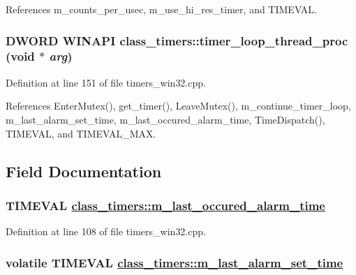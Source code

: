 References m\_\-counts\_\-per\_\-usec, m\_\-use\_\-hi\_\-res\_\-timer, and TIMEVAL.\hypertarget{classclass__timers_a68dd5b6225b3519b4bc2a0280683c87}{
\subsubsection[timer\_\-loop\_\-thread\_\-proc]{\setlength{\rightskip}{0pt plus 5cm}DWORD WINAPI class\_\-timers::timer\_\-loop\_\-thread\_\-proc (void $\ast$ {\em arg})}}
\label{classclass__timers_a68dd5b6225b3519b4bc2a0280683c87}




Definition at line 151 of file timers\_\-win32.cpp.

References Enter\-Mutex(), get\_\-timer(), Leave\-Mutex(), m\_\-continue\_\-timer\_\-loop, m\_\-last\_\-alarm\_\-set\_\-time, m\_\-last\_\-occured\_\-alarm\_\-time, Time\-Dispatch(), TIMEVAL, and TIMEVAL\_\-MAX.

\subsection{Field Documentation}
\hypertarget{classclass__timers_01c07cb9949b61fce137e60a54d001b9}{
\subsubsection[m\_\-last\_\-occured\_\-alarm\_\-time]{\setlength{\rightskip}{0pt plus 5cm}TIMEVAL \hyperlink{classclass__timers_01c07cb9949b61fce137e60a54d001b9}{class\_\-timers::m\_\-last\_\-occured\_\-alarm\_\-time}}}
\label{classclass__timers_01c07cb9949b61fce137e60a54d001b9}




Definition at line 108 of file timers\_\-win32.cpp.\hypertarget{classclass__timers_d45784e3a40494a35d5684ab8df0bfc9}{
\subsubsection[m\_\-last\_\-alarm\_\-set\_\-time]{\setlength{\rightskip}{0pt plus 5cm}volatile TIMEVAL \hyperlink{classclass__timers_d45784e3a40494a35d5684ab8df0bfc9}{class\_\-timers::m\_\-last\_\-alarm\_\-set\_\-time}}}
\label{classclass__timers_d45784e3a40494a35d5684ab8df0bfc9}




